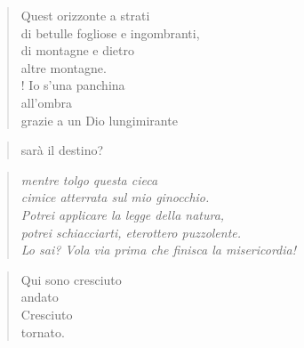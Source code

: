 
\begin{verse}
    Quest orizzonte a strati\\
    di betulle fogliose e ingombranti,\\
    di montagne e dietro\\
    altre montagne.\\!
    Io s'una panchina\\
    all'ombra\\
    grazie a un Dio lungimirante\\
\end{verse}
\vspace{-0.9cm}
\begin{verse}
    \hfill sarà il destino?
\end{verse}
\begin{verse}
    \textit{mentre tolgo questa cieca}\\
    \textit{cimice atterrata sul mio ginocchio.}\\
    \textit{Potrei applicare la legge della natura,}\\
    \textit{potrei schiacciarti, eterottero puzzolente.}\\
    \textit{Lo sai? Vola via prima che finisca la misericordia!}\\
\end{verse}
\begin{verse}
    Qui sono cresciuto\\
    \hspace{1.52cm} andato\\
    \hspace{1.52cm} Cresciuto\\
    \hspace{1.52cm} tornato.\\
\end{verse}